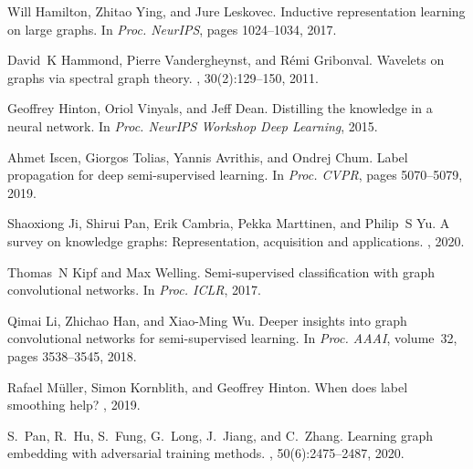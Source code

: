 \documentclass{article}
\begin{document}
\begin{thebibliography}{}
Will Hamilton, Zhitao Ying, and Jure Leskovec.
\newblock Inductive representation learning on large graphs.
\newblock In {\em Proc. NeurIPS}, pages 1024--1034, 2017.

David~K Hammond, Pierre Vandergheynst, and R{\'e}mi Gribonval.
\newblock Wavelets on graphs via spectral graph theory.
, 30(2):129--150,
  2011.

Geoffrey Hinton, Oriol Vinyals, and Jeff Dean.
\newblock Distilling the knowledge in a neural network.
\newblock In {\em Proc. NeurIPS Workshop Deep Learning}, 2015.

Ahmet Iscen, Giorgos Tolias, Yannis Avrithis, and Ondrej Chum.
\newblock Label propagation for deep semi-supervised learning.
\newblock In {\em Proc. CVPR}, pages 5070--5079, 2019.

Shaoxiong Ji, Shirui Pan, Erik Cambria, Pekka Marttinen, and Philip~S Yu.
\newblock A survey on knowledge graphs: Representation, acquisition and
  applications.
, 2020.

Thomas~N Kipf and Max Welling.
\newblock Semi-supervised classification with graph convolutional networks.
\newblock In {\em Proc. ICLR}, 2017.

Qimai Li, Zhichao Han, and Xiao-Ming Wu.
\newblock Deeper insights into graph convolutional networks for semi-supervised
  learning.
\newblock In {\em Proc. AAAI}, volume~32, pages 3538--3545, 2018.

Rafael M{\"u}ller, Simon Kornblith, and Geoffrey Hinton.
\newblock When does label smoothing help?
, 2019.

S.~{Pan}, R.~{Hu}, S.~{Fung}, G.~{Long}, J.~{Jiang}, and C.~{Zhang}.
\newblock Learning graph embedding with adversarial training methods.
, 50(6):2475--2487, 2020.


\end{thebibliography}
\end{document}
